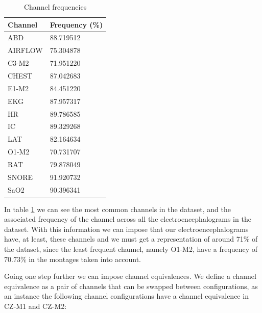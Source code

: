 \begin{table}[H]
\begin{center}
\begin{tabular}{ |p{3cm}||p{3cm}| }
 \hline
 Channel & Frequency (\%)\\
 \hline
 ABD & 88.719512 \\ 
 AIRFLOW & 75.304878 \\  
 C3-M2 & 71.951220 \\
 CHEST & 87.042683 \\
 E1-M2 & 84.451220 \\
 EKG & 87.957317 \\
 HR & 89.786585 \\
 IC & 89.329268 \\
 LAT & 82.164634 \\
 O1-M2 & 70.731707 \\
 RAT & 79.878049 \\
 SNORE & 91.920732 \\
 SaO2 & 90.396341 \\
 \hline
\end{tabular}
\end{center}
\caption{Channel frequencies}
\label{tab1}
\end{table}

In table \ref{tab1} we can see the most common channels in the dataset, and the associated frequency of the channel across all the electroencephalograms in the dataset. With this information we can impose that our electroencephalograms have, at least, these channels and we must get a representation of around 71\% of the dataset, since the least frequent channel, namely O1-M2, have a frequency of 70.73\% in the montages taken into account. 

Going one step further we can impose channel equivalences. We define a channel equivalence as a pair of channels that can be swapped between configurations, as an instance the following channel configurations have a channel equivalence in CZ-M1 and CZ-M2:

